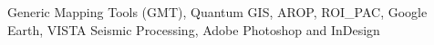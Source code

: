 
    \item [Software:] Generic Mapping Tools (GMT), Quantum GIS, AROP, ROI\_PAC, Google Earth, VISTA Seismic Processing, Adobe Photoshop and InDesign
